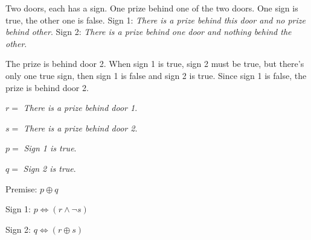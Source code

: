 \begin{prob}

Two doors, each has a sign. One prize behind one of the two doors. One sign is true, the other one is false. Sign 1: \textit{There is a prize behind this door and no prize behind other}. Sign 2: \textit{There is a prize behind one door and nothing behind the other}.

The prize is behind door 2. When sign 1 is true, sign 2 must be true, but there's only one true sign, then sign 1 is false and sign 2 is true. Since sign 1 is false, the prize is behind door 2.

$r = $ \textit{There is a prize behind door 1}.

$s = $ \textit{There is a prize behind door 2}.

$p = $ \textit{Sign 1 is true}.

$q = $ \textit{Sign 2 is true}.

Premise: $p \oplus q$

Sign 1: $p \Leftrightarrow (r \land \lnot s)$

Sign 2: $q \Leftrightarrow (r \oplus s)$



\end{prob}
















